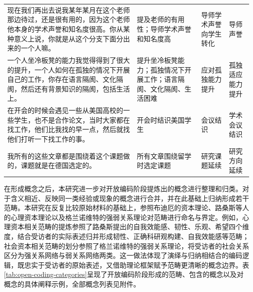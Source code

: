 {\begin{longtable}{p{6.5cm}p{2.5cm}p{2.5cm}p{2.5cm}}
现在我们再出去说我某年某月在这个老师那边待过，还是很有用的，因为这个老师他本身的学术声誉和知名度很高。你从某种意义上说，你就是从这个分支下面分出来的一个人嘛。 & 提及老师的有用性；导师学术声誉和知名度高 & 导师学术声誉向学生转化 & 导师声誉 \\
一个人坐冷板凳的能力我觉得得到了很大的提升，一个人如何在孤独的情况下开展自己的工作，你存在语言隔阂、文化隔阂，然后还有背景知识的隔阂，包括生活上。 & 提升坐冷板凳能力；孤独情况下开展工作；语言隔阂、文化隔阂、生活困难 & 应对孤独能力提升 & 孤独适应能力提升 \\
在开会的时候会遇见一些从美国高校的一些学生，也不是合作论文，当时大家都在找工作，他们比我找的早一点，然后就找他们打听一下找工作的事。 & 开会时结识美国学生 & 会议结识 & 学术会议结识 \\
我所有的这些文章都是围绕着这个课题做的，课题就是在德国选定的。 & 所有文章围绕留学时选定课题 & 研究课题延续 & 研究方向延续 \\
\end{longtable}
}

在形成概念之后，本研究进一步对开放编码阶段提炼出的概念进行整理和归类。对于含义相近、反映同一类经验或现象的概念进行合并，并在此基础上归纳形成若干范畴。本研究在反复比较原始材料的基础上，参照布迪厄的资本理论、路桑斯等人的心理资本理论以及格兰诺维特的强弱关系理论对范畴进行命名与界定。例如，心理资本相关范畴的提炼参照了路桑斯提出的自我效能感、韧性、乐观、希望四个维度，结合受访者的实际表述归并形成韧性、正确科研观构建、自我效能感等范畴；社会资本相关范畴的划分参照了格兰诺维特的强弱关系理论，将受访者的社会关系区分为强关系网络与弱关系网络两类。这一做法体现了演绎与归纳相结合的编码逻辑，既忠实于受访者的原始表述，又借助理论框架赋予范畴更清晰的概念边界。表\ref{tab:open-coding-categories}呈现了开放编码阶段形成的范畴、包含的概念以及对概念的具体阐释示例，全部概念列表见附件。

